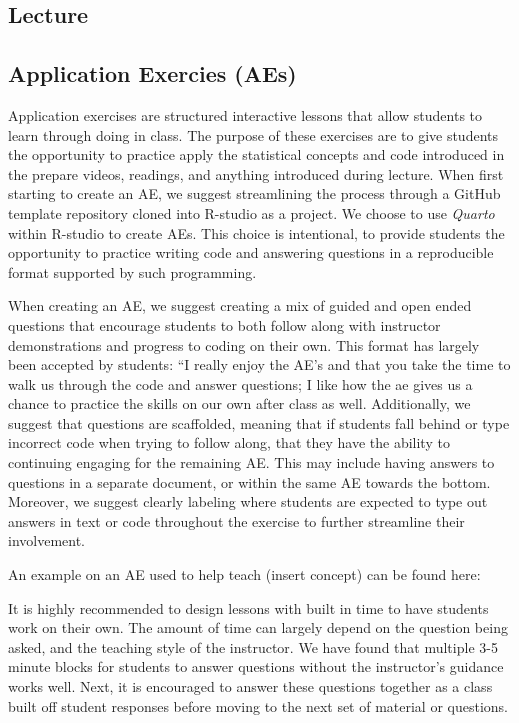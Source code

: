 \documentclass[
  12pt]{article}
\begin{document}
\hypertarget{lecture}{%
\subsection{Lecture}\label{lecture}}

\hypertarget{application-exercies-aes}{%
\subsection{Application Exercies (AEs)}\label{application-exercies-aes}}

Application exercises are structured interactive lessons that allow
students to learn through doing in class. The purpose of these exercises
are to give students the opportunity to practice apply the statistical
concepts and code introduced in the prepare videos, readings, and
anything introduced during lecture. When first starting to create an AE,
we suggest streamlining the process through a GitHub template repository
cloned into R-studio as a project. We choose to use \emph{Quarto} within
R-studio to create AEs. This choice is intentional, to provide students
the opportunity to practice writing code and answering questions in a
reproducible format supported by such programming.

When creating an AE, we suggest creating a mix of guided and open ended
questions that encourage students to both follow along with instructor
demonstrations and progress to coding on their own. This format has
largely been accepted by students: ``I really enjoy the AE's and that
you take the time to walk us through the code and answer questions; I
like how the ae gives us a chance to practice the skills on our own
after class as well. Additionally, we suggest that questions are
scaffolded, meaning that if students fall behind or type incorrect code
when trying to follow along, that they have the ability to continuing
engaging for the remaining AE. This may include having answers to
questions in a separate document, or within the same AE towards the
bottom. Moreover, we suggest clearly labeling where students are
expected to type out answers in text or code throughout the exercise to
further streamline their involvement.

An example on an AE used to help teach (insert concept) can be found
here:

It is highly recommended to design lessons with built in time to have
students work on their own. The amount of time can largely depend on the
question being asked, and the teaching style of the instructor. We have
found that multiple 3-5 minute blocks for students to answer questions
without the instructor's guidance works well. Next, it is encouraged to
answer these questions together as a class built off student responses
before moving to the next set of material or questions.
\end{document}
